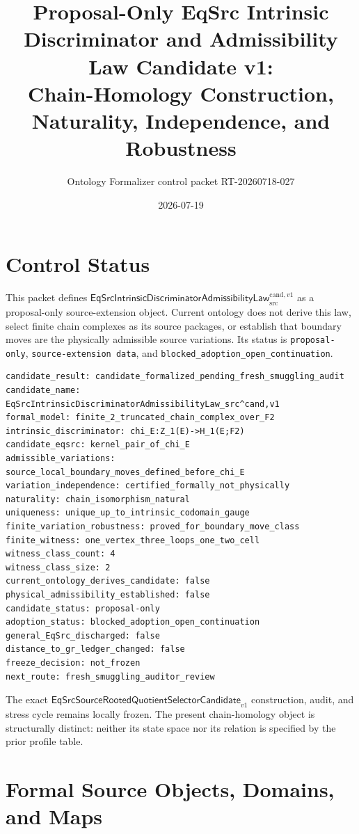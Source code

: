 \documentclass[11pt]{article}
\title{Proposal-Only EqSrc Intrinsic Discriminator and Admissibility Law Candidate v1:\\
Chain-Homology Construction, Naturality, Independence, and Robustness}
\author{Ontology Formalizer control packet RT-20260718-027}
\date{2026-07-19}
\begin{document}
\maketitle

\section{Control Status}

This packet defines
\(\mathsf{EqSrcIntrinsicDiscriminatorAdmissibilityLaw}^{\mathrm{cand},v1}_{\mathrm{src}}\)
as a proposal-only source-extension object. Current ontology does not derive
this law, select finite chain complexes as its source packages, or establish
that boundary moves are the physically admissible source variations. Its
status is \texttt{proposal-only},
\texttt{source-extension data}, and
\texttt{blocked\_adoption\_open\_continuation}.

\begin{verbatim}
candidate_result: candidate_formalized_pending_fresh_smuggling_audit
candidate_name: EqSrcIntrinsicDiscriminatorAdmissibilityLaw_src^cand,v1
formal_model: finite_2_truncated_chain_complex_over_F2
intrinsic_discriminator: chi_E:Z_1(E)->H_1(E;F2)
candidate_eqsrc: kernel_pair_of_chi_E
admissible_variations: source_local_boundary_moves_defined_before_chi_E
variation_independence: certified_formally_not_physically
naturality: chain_isomorphism_natural
uniqueness: unique_up_to_intrinsic_codomain_gauge
finite_variation_robustness: proved_for_boundary_move_class
finite_witness: one_vertex_three_loops_one_two_cell
witness_class_count: 4
witness_class_size: 2
current_ontology_derives_candidate: false
physical_admissibility_established: false
candidate_status: proposal-only
adoption_status: blocked_adoption_open_continuation
general_EqSrc_discharged: false
distance_to_gr_ledger_changed: false
freeze_decision: not_frozen
next_route: fresh_smuggling_auditor_review
\end{verbatim}

The exact
\(\mathsf{EqSrcSourceRootedQuotientSelectorCandidate}_{v1}\) construction,
audit, and stress cycle remains locally frozen. The present chain-homology
object is structurally distinct: neither its state space nor its relation is
specified by the prior profile table.

\section{Formal Source Objects, Domains, and Maps}
\end{document}
